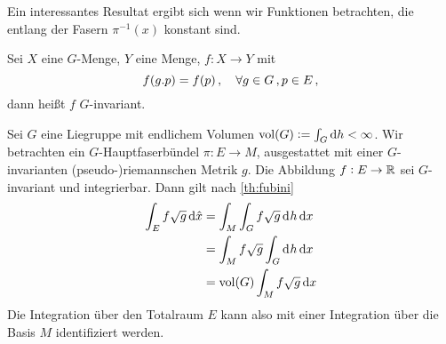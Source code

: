 Ein interessantes Resultat ergibt sich wenn wir Funktionen betrachten, die
entlang der Fasern $\pi^{-1}(x)$ konstant sind.
\begin{definition}
Sei $X$ eine $G$-Menge, $Y$ eine Menge, $f:X\to Y$ mit
\begin{equation}
f(g. p)=f(p)\,,\quad \forall g\in G\,,p\in E\,,
\end{equation}
dann heißt $f$ $G$-invariant.
\end{definition}
Sei $G$ eine Liegruppe mit endlichem Volumen $\vol(G):=\int_G\dif h<\infty$. 
Wir betrachten ein $G$-Hauptfaserbündel $\pi: E\to M$,
ausgestattet mit einer $G$-invarianten (pseudo-)riemannschen Metrik $g$. 
Die Abbildung $f:E\to \mathbb{R}$ sei $G$-invariant und integrierbar. Dann gilt nach
\autoref{th:fubini}
\begin{equation}
\begin{split}
\int_E f\sqrt{g}\dif{}\hat{x}&=\int_{M}\int_{G}f\sqrt{g}\dif^{}h \dif x\\
&=\int_{M}f\sqrt{g}\int_{G}\dif^{}h \dif x\\
&=\vol(G)\int_{M}f\sqrt{g} \dif x\\
\end{split}
\end{equation}
Die Integration über den Totalraum $E$ kann also mit einer Integration über die
Basis $M$ identifiziert werden.
